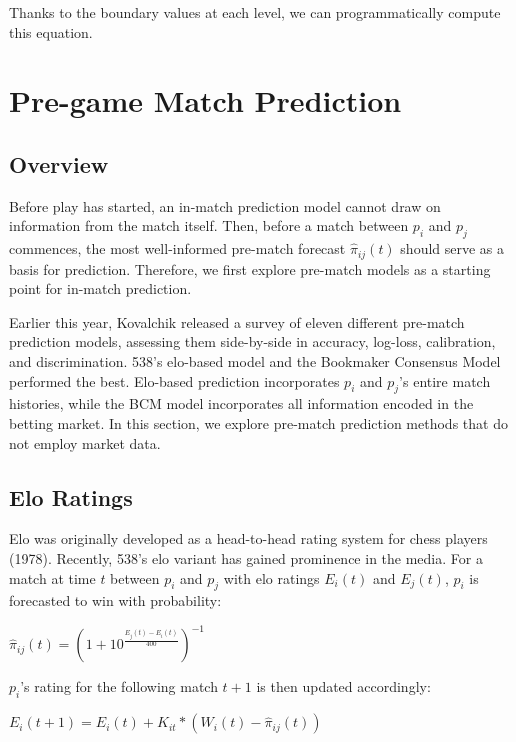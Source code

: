 \documentclass[chapterprefix=false]{report}
\begin{document}
Thanks to the boundary values at each level, we can programmatically compute this equation.

\chapter{Pre-game Match Prediction}

\section{Overview}
Before play has started, an in-match prediction model cannot draw on information from the match itself. Then, before a match between $p_i$ and $p_j$ commences, the most well-informed pre-match forecast $\hat{\pi}_{ij}(t)$ should serve as a basis for prediction. Therefore, we first explore pre-match models as a starting point for in-match prediction.

Earlier this year, Kovalchik released a survey of eleven different pre-match prediction models, assessing them side-by-side in accuracy, log-loss, calibration, and discrimination. 538's elo-based model and the Bookmaker Consensus Model performed the best. Elo-based prediction incorporates $p_i$ and $p_j$'s entire match histories, while the BCM model incorporates all information encoded in the betting market. In this section, we explore pre-match prediction methods that do not employ market data.


\section{Elo Ratings}
Elo was originally developed as a head-to-head rating system for chess players (1978). Recently, 538's elo variant has gained prominence in the media. For a match at time $t$ between $p_i$ and $p_j$ with elo ratings $E_i(t)$ and $E_j(t)$, $p_i$ is forecasted to win with probability:

\begin{center}
$\hat{\pi}_{ij}(t) = (1 + 10^\frac{E_j(t)-E_i(t)}{400})^{-1}$
\end{center}

$p_i$'s rating for the following match $t+1$ is then updated accordingly:

\begin{center}
$E_i(t+1) = E_i(t) + K_{it}*(W_i(t)-\hat{\pi}_{ij}(t))$
\end{center}
\end{document}
